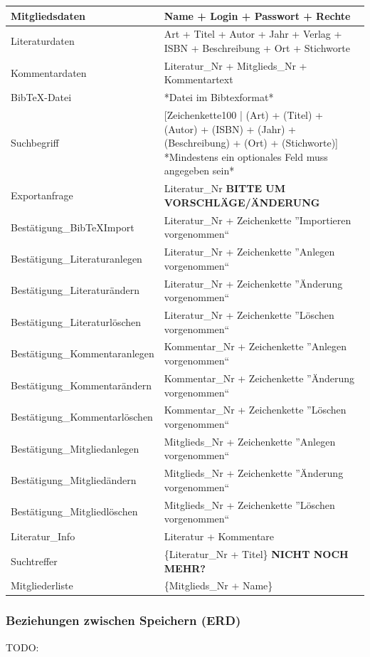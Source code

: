 \begin{longtable}{|l|p{8.5cm}|}
Mitgliedsdaten & Name + Login + Passwort + Rechte \\
\hline
Literaturdaten & Art + Titel + Autor + Jahr + Verlag + ISBN + Beschreibung + Ort + Stichworte \\
\hline
Kommentardaten & Literatur\_Nr + Mitglieds\_Nr + Kommentartext \\
\hline
BibTeX-Datei & *Datei im Bibtexformat* \\
\hline
Suchbegriff & [Zeichenkette100 | (Art) + (Titel) + (Autor) + (ISBN) + (Jahr) + (Beschreibung) + (Ort) + (Stichworte)] *Mindestens ein optionales Feld muss angegeben sein* \\
\hline
Exportanfrage & Literatur\_Nr \textbf{BITTE UM VORSCHLÄGE/ÄNDERUNG} \\
\hline\hline

Bestätigung\_BibTeXImport & Literatur\_Nr + Zeichenkette ''Importieren vorgenommen`` \\
\hline
Bestätigung\_Literaturanlegen & Literatur\_Nr + Zeichenkette ''Anlegen vorgenommen`` \\
\hline
Bestätigung\_Literaturändern & Literatur\_Nr + Zeichenkette ''Änderung vorgenommen`` \\
\hline
Bestätigung\_Literaturlöschen & Literatur\_Nr + Zeichenkette ''Löschen vorgenommen`` \\
\hline
Bestätigung\_Kommentaranlegen & Kommentar\_Nr + Zeichenkette ''Anlegen vorgenommen`` \\
\hline
Bestätigung\_Kommentarändern & Kommentar\_Nr + Zeichenkette ''Änderung vorgenommen`` \\
\hline
Bestätigung\_Kommentarlöschen & Kommentar\_Nr + Zeichenkette ''Löschen vorgenommen`` \\
\hline
Bestätigung\_Mitgliedanlegen & Mitglieds\_Nr + Zeichenkette ''Anlegen vorgenommen`` \\
\hline
Bestätigung\_Mitgliedändern & Mitglieds\_Nr + Zeichenkette ''Änderung vorgenommen`` \\
\hline
Bestätigung\_Mitgliedlöschen & Mitglieds\_Nr + Zeichenkette ''Löschen vorgenommen`` \\
\hline
Literatur\_Info & Literatur + Kommentare \\
\hline
Suchtreffer & \{Literatur\_Nr + Titel\} \textbf{NICHT NOCH MEHR?}\\
\hline
Mitgliederliste & \{Mitglieds\_Nr + Name\}\\
\hline
\end{longtable}

\subsubsection{Beziehungen zwischen Speichern (ERD)}
TODO:

